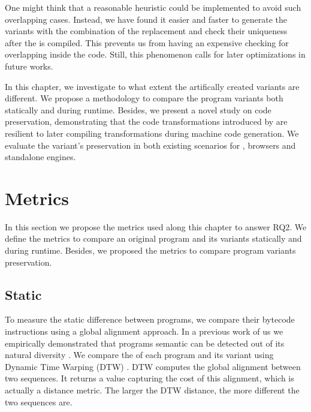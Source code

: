 One might think that a reasonable heuristic could be implemented to avoid such overlapping cases. Instead, we have found it easier and faster to generate the variants with the combination of the replacement and check their uniqueness after the is compiled. This prevents us from having an expensive checking for overlapping inside the code. Still, this phenomenon calls for later optimizations in future works.




In this chapter, we investigate to what extent the artifically created variants are different. We propose a methodology to compare the program variants both statically and during runtime. Besides, we present a novel study on code preservation, demonstrating that the code transformations introduced by are resilient to later compiling transformations during machine code generation. We evaluate the variant's preservation in both existing scenarios for \wasm, browsers and standalone engines.

\section{Metrics}

In this section we propose the metrics used along this chapter to answer RQ2. We define the metrics to compare an original program and its variants statically and during runtime. Besides, we proposed the metrics to compare program variants preservation.

\subsection{Static}

To measure the static difference between programs, we compare their bytecode instructions using a global alignment approach. In a previous work of us  we empirically demonstrated that programs semantic can be detected out of its natural diversity \citationneeded. We compare the \wasm of each program and its variant using Dynamic Time Warping (DTW) \cite{Maia08usinga}. DTW computes the global alignment between two sequences. It returns a value capturing the cost of this alignment, which is actually a distance metric. The larger the DTW distance, the more different the two sequences are.


